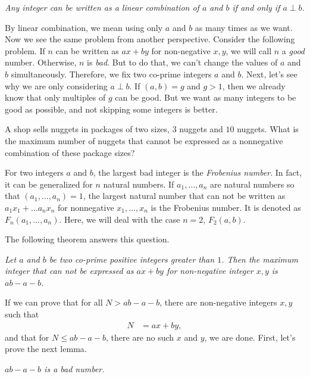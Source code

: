 \documentclass{subfile}
\begin{document}
	\begin{theorem}\slshape
		Any integer can be written as a linear combination of $a$ and $b$ if and only if $a\perp b$.
	\end{theorem}
By linear combination, we mean using only $a$ and $b$ as many times as we want. Now we see the same problem from another perspective. Consider the following problem. If $n$ can be written as $ax+by$ for non-negative $x,y$, we will call $n$ a \textit{good} number. Otherwise, $n$ is \textit{bad}. But to do that, we can't change the values of $a$ and $b$ simultaneously. Therefore, we fix two co-prime integers $a$ and $b$. Next, let's see why we are only considering $a\perp b$. If $(a,b)=g$ and $g>1$, then we already know that only multiples of $g$ can be good. But we want as many integers to be good as possible, and not skipping some integers is better.
	\begin{problem}
		A shop sells nuggets in packages of two sizes, $3$ nuggets and $10$ nuggets. What is the maximum number of nuggets that cannot be expressed as a nonnegative combination of these package sizes?
	\end{problem}

	\begin{definition}
		For two integers $a$ and $b$, the largest bad integer is the \textit{Frobenius number}. In fact, it can be generalized for $n$ natural numbers. If $a_1,\ldots,a_n$ are natural numbers so that $(a_1,\ldots,a_n)=1$, the largest natural number that can not be written as $a_1x_1+\ldots a_nx_n$ for nonnegative $x_1,\ldots,x_n$ is the Frobenius number. It is denoted as $F_n(a_1,\ldots,a_n)$. Here, we will deal with the case $n=2$, $F_2(a,b)$.
	\end{definition}
The following theorem answers this question.
	\begin{theorem}\slshape
		Let $a$ and $b$ be two co-prime positive integers greater than $1$. Then the maximum integer that can not be expressed as $ax+by$ for non-negative integer $x,y$ is $ab-a-b$.
	\end{theorem}
If we can prove that for all $N>ab-a-b$, there are non-negative integers $x,y$ such that
	\begin{align*}
		N & = ax+by,
	\end{align*}
and that for $N\leq ab-a-b$, there are no such $x$ and $y$, we are done. First, let's prove the next lemma.
	\begin{lemma}\slshape
		$ab-a-b$ is a bad number.
	\end{lemma}
\end{document}
